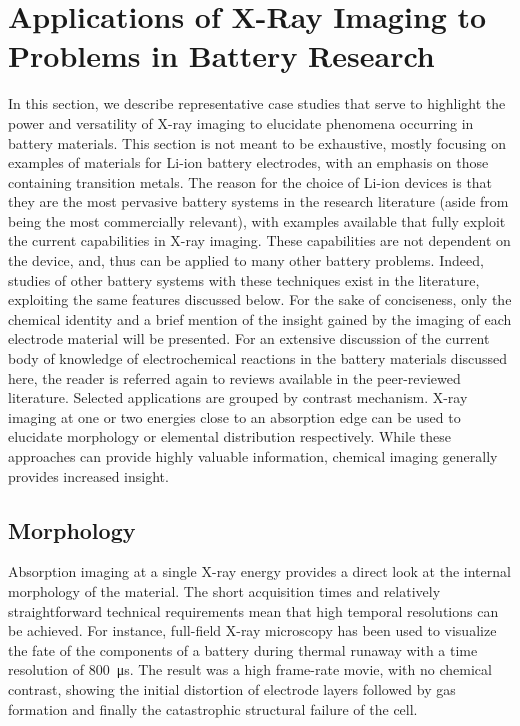 \documentclass[journal=cmatex,manuscript=perspective]{achemso}
\begin{document}
\section{Applications of X-Ray Imaging to Problems in Battery Research}

In this section, we describe representative case studies that serve to
highlight the power and versatility of X-ray imaging to elucidate
phenomena occurring in battery materials. This section is not meant to
be exhaustive, mostly focusing on examples of materials for Li-ion
battery electrodes, with an emphasis on those containing transition
metals. The reason for the choice of Li-ion devices is that they are
the most pervasive battery systems in the research literature (aside
from being the most commercially relevant), with examples available
that fully exploit the current capabilities in X-ray imaging. These
capabilities are not dependent on the device, and, thus can be applied
to many other battery problems. Indeed, studies of other battery
systems with these techniques exist in the literature, exploiting the
same features discussed below. For the sake of conciseness, only the
chemical identity and a brief mention of the insight gained by the
imaging of each electrode material will be presented. For an extensive
discussion of the current body of knowledge of electrochemical
reactions in the battery materials discussed here, the reader is
referred again to reviews available in the peer-reviewed
literature\cite{whittingham2014, balogun2016}. Selected applications
are grouped by contrast mechanism. X-ray imaging at one or two
energies close to an absorption edge can be used to elucidate
morphology or elemental distribution respectively. While these
approaches can provide highly valuable information, chemical imaging
generally provides increased insight.

\subsection{Morphology}

Absorption imaging at a single X-ray energy provides a direct look at
the internal morphology of the material. The short acquisition times
and relatively straightforward technical requirements mean that high
temporal resolutions can be achieved. For instance, full-field X-ray
microscopy has been used to visualize the fate of the components of a
battery during thermal runaway with a time resolution of
\SI{800}{\micro\second}\cite{shearing2015}. The result was a high
frame-rate movie, with no chemical contrast, showing the initial
distortion of electrode layers followed by gas formation and finally
the catastrophic structural failure of the cell.
\end{document}
